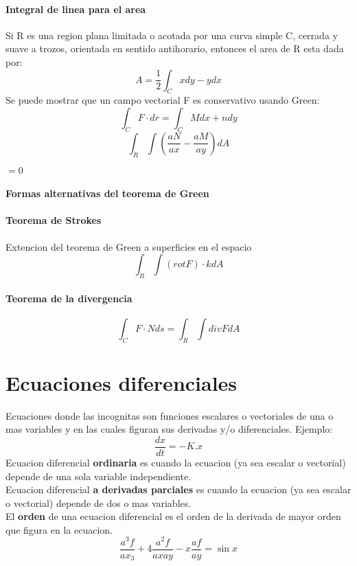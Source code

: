 \documentclass[11pt]{article}
\begin{document}
\paragraph{Integral de linea para el area} Si R es una region plana limitada o acotada por una curva simple C, cerrada y suave a trozos, orientada en sentido antihorario, entonces el area de R esta dada por:
\begin{equation*}
	A = \frac{1}{2} \int_C xdy-ydx
\end{equation*}
Se puede mostrar que un campo vectorial F es conservativo usando Green:
\begin{equation*}
	\int_C F \cdot dr = \int_C M dx + n dy
\end{equation*}
\begin{equation*}
	\int_R\int \left( \dfrac{aN}{ax} - \dfrac{aM}{ay} \right)dA
\end{equation*}
\begin{center}
	$ = 0$
\end{center}
\paragraph{Formas alternativas del teorema de Green}
\paragraph{Teorema de Strokes} Extencion del teorema de Green a superficies en el espacio
\begin{equation*}
	\int_R\int (rot F) \cdot k dA
\end{equation*}
\paragraph{Teorema de la divergencia}
\begin{equation*}
	\int_C F \cdot N ds = \int_R\int div F dA
\end{equation*}
\section{Ecuaciones diferenciales}
Ecuaciones donde las incognitas son funciones escalares o vectoriales de una o mas variables y en las cuales figuran sus derivadas y/o diferenciales. Ejemplo:
\begin{equation*}
	\dfrac{dx}{dt} = -K.x
\end{equation*}
Ecuacion diferencial \textbf{ordinaria} es cuando la ecuacion (ya sea escalar o vectorial) depende de una sola variable independiente.\\
\linebreak
Ecuacion diferencial \textbf{a derivadas parciales} es cuando la ecuacion (ya sea escalar o vectorial) depende de dos o mas variables.\\
\linebreak
El \textbf{orden} de una ecuacion diferencial es el orden de la derivada de mayor orden que figura en la ecuacion.
\begin{equation*}
	\dfrac{a^3f}{ax_3} + 4 \dfrac{a^2f}{axay} - x \dfrac{af}{ay} = \sin x
\end{equation*}
\end{document}
